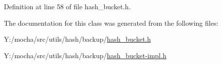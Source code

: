 Definition at line 58 of file hash\_\-bucket.h.



The documentation for this class was generated from the following files:\begin{DoxyCompactItemize}
\item 
Y:/mocha/src/utils/hash/backup/\hyperlink{backup_2hash__bucket_8h}{hash\_\-bucket.h}\item 
Y:/mocha/src/utils/hash/backup/\hyperlink{hash__bucket-impl_8h}{hash\_\-bucket-\/impl.h}\end{DoxyCompactItemize}
